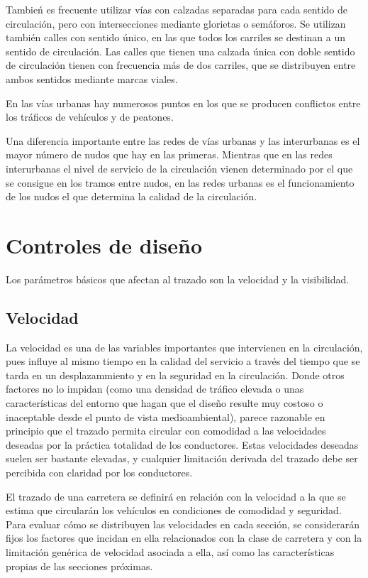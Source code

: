 \documentclass[letterpaper,10pt,english]{sphinxmanual}
\begin{document}
Tambień es frecuente utilizar vías con calzadas separadas para cada sentido de circulación, pero con intersecciones mediante glorietas o semáforos. Se utilizan también calles con sentido único, en las que todos los carriles se destinan a un sentido de circulación. Las calles que tienen una calzada única con doble sentido de circulación tienen con frecuencia más de dos carriles, que se distribuyen entre ambos sentidos mediante marcas viales.

En las vías urbanas hay numerosos puntos en los que se producen conflictos entre los tráficos de vehículos y de peatones.

Una diferencia importante entre las redes de vías urbanas y las interurbanas es el mayor número de nudos que hay en las primeras. Mientras que en las redes interurbanas el nivel de servicio de la circulación vienen determinado por el que se consigue en los tramos entre nudos, en las redes urbanas es el funcionamiento de los nudos el que determina la calidad de la circulación.


\chapter{Controles de diseño}
\label{\detokenize{controles::doc}}\label{\detokenize{controles:controles-de-diseno}}
Los parámetros básicos que afectan al trazado son la velocidad y la visibilidad.


\section{Velocidad}
\label{\detokenize{controles:velocidad}}
La velocidad es una de las variables importantes que intervienen en la circulación, pues influye al mismo tiempo en la calidad del servicio a través del tiempo que se tarda en un desplazammiento y en la seguridad en la circulación. Donde otros factores no lo impidan (como una densidad de tráfico elevada o unas características del entorno que hagan que el diseño resulte muy costoso o inaceptable desde el punto de vista medioambiental), parece razonable en principio que el trazado permita circular con comodidad a las velocidades deseadas por la práctica totalidad de los conductores. Estas velocidades deseadas suelen ser bastante elevadas, y cualquier limitación derivada del trazado debe ser percibida con claridad por los conductores.

El trazado de una carretera se definirá en relación con la velocidad a la que se estima que circularán los vehículos en condiciones de comodidad y seguridad. Para evaluar cómo se distribuyen las velocidades en cada sección, se considerarán fijos los factores que incidan en ella relacionados con la clase de carretera y con la limitación genérica de velocidad asociada a ella, así como las características propias de las secciones próximas.
\end{document}
